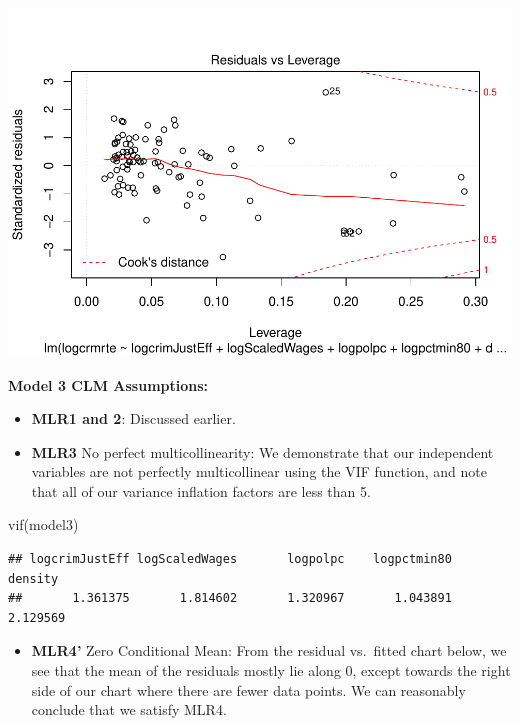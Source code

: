 \documentclass[]{article}
\newenvironment{Shaded}{}{}
\newcommand{\KeywordTok}[1]{\textcolor[rgb]{0.00,0.00,1.00}{#1}}
\newcommand{\NormalTok}[1]{#1}
\providecommand{\tightlist}{%
  \setlength{\itemsep}{0pt}\setlength{\parskip}{0pt}}
\begin{document}
\includegraphics{Bagnard_Gaustad_Hartman_Leung_Lab_3_files/figure-latex/unnamed-chunk-83-1.pdf}

\textbf{Model 3 CLM Assumptions:}

\begin{itemize}
\item
  \textbf{MLR1 and 2}: Discussed earlier.
\item
  \textbf{MLR3} No perfect multicollinearity: We demonstrate that our
  independent variables are not perfectly multicollinear using the VIF
  function, and note that all of our variance inflation factors are less
  than 5.
\end{itemize}

\begin{Shaded}
\begin{Highlighting}[]
\KeywordTok{vif}\NormalTok{(model3)}
\end{Highlighting}
\end{Shaded}

\begin{verbatim}
## logcrimJustEff logScaledWages       logpolpc    logpctmin80        density 
##       1.361375       1.814602       1.320967       1.043891       2.129569
\end{verbatim}

\begin{itemize}
\tightlist
\item
  \textbf{MLR4'} Zero Conditional Mean: From the residual vs.~fitted
  chart below, we see that the mean of the residuals mostly lie along 0,
  except towards the right side of our chart where there are fewer data
  points. We can reasonably conclude that we satisfy MLR4.
\end{itemize}
\end{document}
